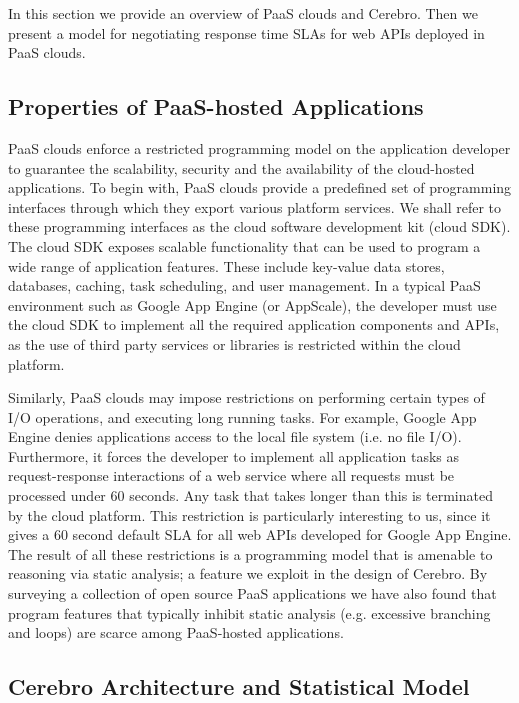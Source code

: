 In this section we provide an overview of PaaS clouds and Cerebro. Then we present a model for 
negotiating response time SLAs for web APIs deployed in PaaS clouds.

\subsection{Properties of PaaS-hosted Applications}
PaaS clouds enforce a restricted programming model on the application developer to guarantee
the scalability, security and the availability of the cloud-hosted applications. To begin with,
PaaS clouds provide a predefined set of programming interfaces through which they export 
various platform services. We shall refer to these programming interfaces as the cloud software
development kit (cloud SDK). The cloud SDK exposes scalable functionality that can be used to 
program a wide range of application features. These include key-value data stores, databases, 
caching, task scheduling, and user management. In a typical PaaS environment
such as Google App Engine (or AppScale), the developer must use the cloud SDK to implement
all the required application components and APIs, as the use of third party services or libraries is
restricted within the cloud platform. 

Similarly, PaaS clouds may impose restrictions on performing
certain types of I/O operations, and executing long running tasks. For example, Google App Engine
denies applications access to the local file system (i.e. no file I/O). Furthermore, it forces the
developer to implement all application tasks as request-response interactions of a web service
where all requests must be processed
under 60 seconds. Any task that takes longer than this is terminated by the cloud platform.
This restriction is particularly interesting to us, since it gives a 60 second default SLA
for all web APIs developed for Google App Engine.
The result of all these restrictions is a programming model that is
amenable to reasoning via static analysis; a feature we exploit in the design of Cerebro. By surveying
a collection of open source PaaS applications we have also found that program features that typically
inhibit static analysis (e.g. excessive branching and loops) are scarce among PaaS-hosted
applications.

\subsection{Cerebro Architecture and Statistical Model}


